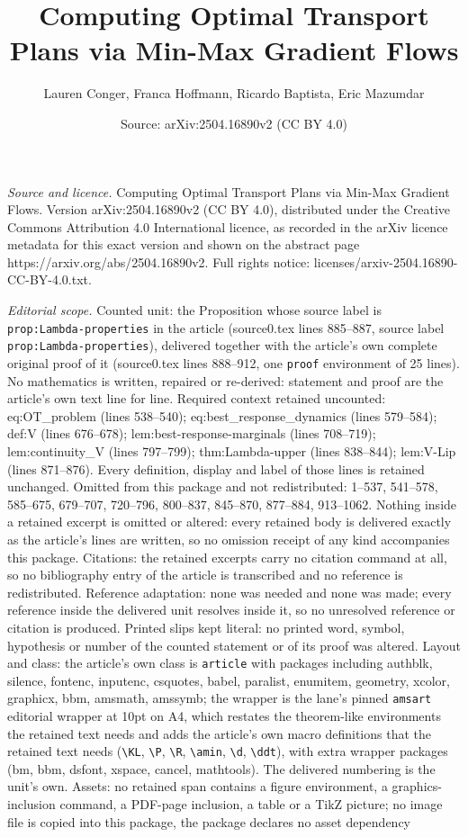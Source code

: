 \documentclass[10pt,a4paper]{amsart}
\title[Computing Optimal Transport Plans via Min-Max Gradient Flows]{Computing Optimal Transport Plans via Min-Max Gradient Flows}
\author{Lauren Conger, Franca Hoffmann, Ricardo Baptista, Eric Mazumdar}
\date{Source: arXiv:2504.16890v2 (CC BY 4.0)}
\begin{document}
\maketitle

\noindent\emph{Source and licence.} Computing Optimal Transport Plans via Min-Max Gradient Flows. Version arXiv:2504.16890v2 (CC BY 4.0), distributed under the Creative Commons Attribution 4.0 International licence, as recorded in the arXiv licence metadata for this exact version and shown on the abstract page https://arxiv.org/abs/2504.16890v2. Full rights notice: licenses/arxiv-2504.16890-CC-BY-4.0.txt.\par\smallskip

\noindent\textit{Editorial scope.} Counted unit: the Proposition whose source label is \texttt{prop:Lambda-properties} in the article (source0.tex lines 885--887, source label \texttt{prop:Lambda-properties}), delivered together with the article's own complete original proof of it (source0.tex lines 888--912, one \texttt{proof} environment of 25 lines). No mathematics is written, repaired or re-derived: statement and proof are the article's own text line for line. Required context retained uncounted: eq:OT\_problem (lines 538--540); eq:best\_response\_dynamics (lines 579--584); def:V (lines 676--678); lem:best-response-marginals (lines 708--719); lem:continuity\_V (lines 797--799); thm:Lambda-upper (lines 838--844); lem:V-Lip (lines 871--876). Every definition, display and label of those lines is retained unchanged. Omitted from this package and not redistributed: 1--537, 541--578, 585--675, 679--707, 720--796, 800--837, 845--870, 877--884, 913--1062. Nothing inside a retained excerpt is omitted or altered: every retained body is delivered exactly as the article's lines are written, so no omission receipt of any kind accompanies this package. Citations: the retained excerpts carry no citation command at all, so no bibliography entry of the article is transcribed and no reference is redistributed. Reference adaptation: none was needed and none was made; every reference inside the delivered unit resolves inside it, so no unresolved reference or citation is produced. Printed slips kept literal: no printed word, symbol, hypothesis or number of the counted statement or of its proof was altered. Layout and class: the article's own class is \texttt{article} with packages including authblk, silence, fontenc, inputenc, csquotes, babel, paralist, enumitem, geometry, xcolor, graphicx, bbm, amsmath, amssymb; the wrapper is the lane's pinned \texttt{amsart} editorial wrapper at 10pt on A4, which restates the theorem-like environments the retained text needs and adds the article's own macro definitions that the retained text needs (\texttt{\textbackslash KL}, \texttt{\textbackslash P}, \texttt{\textbackslash R}, \texttt{\textbackslash amin}, \texttt{\textbackslash d}, \texttt{\textbackslash ddt}), with extra wrapper packages (bm, bbm, dsfont, xspace, cancel, mathtools). The delivered numbering is the unit's own. Assets: no retained span contains a figure environment, a graphics-inclusion command, a PDF-page inclusion, a table or a TikZ picture; no image file is copied into this package, the package declares no asset dependency 
\end{document}
